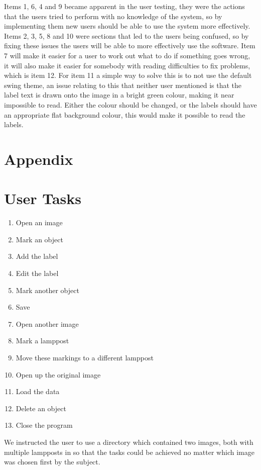 \documentclass[a4paper,11pt,oneside]{article}
\begin{document}
Items 1, 6, 4 and 9 became apparent in the user testing, they were the actions that the users tried to perform with no knowledge of the system, so by implementing them new users should be able to use the system more effectively.  Items 2, 3, 5, 8 and 10 were sections that led to the users being confused, so by fixing these issues the users will be able to more effectively use the software.  Item 7 will make it easier for a user to work out what to do if something goes wrong, it will also make it easier for somebody with reading difficulties to fix problems, which is item 12.  For item 11 a simple way to solve this is to not use the default swing theme, an issue relating to this that neither user mentioned is that the label text is drawn onto the image in a bright green colour, making it near impossible to read.  Either the colour should be changed, or the labels should have an appropriate flat background colour, this would make it possible to read the labels.

\newpage
\section{Appendix}
\appendix

\section{User Tasks}
\label{sec:tasks}

\begin{enumerate}
    \item Open an image
    \item Mark an object
    \item Add the label
    \item Edit the label
    \item Mark another object
    \item Save
    \item Open another image
    \item Mark a lamppost
    \item Move these markings to a different lamppost
    \item Open up the original image
    \item Load the data
    \item Delete an object
    \item Close the program
\end{enumerate}

We instructed the user to use a directory which contained two images, both with multiple lampposts in so that the tasks could be achieved no matter which image was chosen first by the subject.
\end{document}
